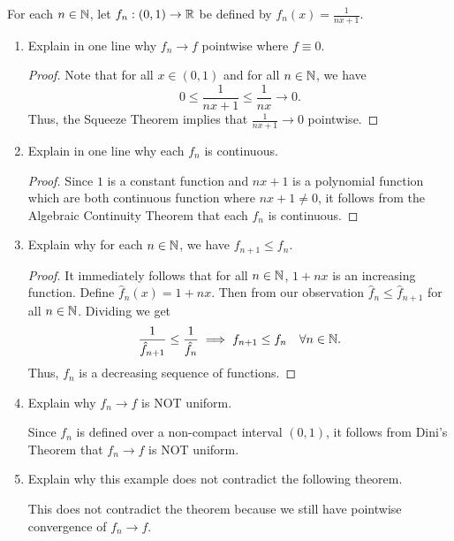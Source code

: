 \documentclass[a4paper]{article}
\begin{document}
\begin{problem}
    For each \( n \in \mathbb{N} \), let \( {f}_{n}: (0,1) \to \mathbb{R}  \) be defined by \( {f}_{n}(x) = \frac{ 1  }{  n x + 1  }  \).
\end{problem}
\begin{enumerate}
    \item Explain in one line why \( {f}_{n} \to f  \) pointwise where \( f \equiv 0  \).
        \begin{proof}
        Note that for all \( x \in (0,1)\) and for all \( n \in \mathbb{N} \), we have 
        \[  0 \leq \frac{ 1  }{  nx + 1  }  \leq \frac{ 1 }{ nx } \to 0. \]
        Thus, the Squeeze Theorem implies that \( \frac{ 1 }{ nx + 1  }  \to  0  \) pointwise.
        \end{proof}
    \item Explain in one line why each \( {f}_{n} \) is continuous. 
        \begin{proof}
        Since \( 1  \) is a constant function and \( nx + 1  \) is a polynomial function which are both continuous function where \( nx + 1 \neq 0  \), it follows from the Algebraic Continuity Theorem that each \( {f}_{n} \) is continuous.
        \end{proof}
    \item Explain why for each \( n \in \mathbb{N} \), we have \( {f}_{n+1}\leq {f}_{n} \).
        \begin{proof}
            It immediately follows that for all \( n \in \mathbb{N} \), \( 1 + nx  \) is an increasing function. Define \( \hat{f}_{n}(x) = 1 + nx \). Then from our observation \( \hat{f}_{n} \leq \hat{f}_{n+1} \) for all \( n \in \mathbb{N} \). Dividing we get 
            \[  \frac{ 1 }{ \hat{f}_{n+1} } \leq \frac{ 1 }{ \hat{f}_{n} } \implies {f}_{n+1} \leq {f}_{n}  \ \ \ \forall n \in \mathbb{N}.\]
            Thus, \( {f}_{n} \) is a decreasing sequence of functions.
        \end{proof}
    \item Explain why \( {f}_{n} \to f  \) is NOT uniform.
        \begin{solution}
        Since \( {f}_{n} \) is defined over a non-compact interval \( (0,1) \), it follows from Dini's Theorem that \( {f}_{n} \to f  \) is NOT uniform.
        \end{solution}
    \item Explain why this example does not contradict the following theorem.
        \begin{solution}
        This does not contradict the theorem because we still have pointwise convergence of \( {f}_{n} \to f  \).
        \end{solution}
\end{enumerate}
\end{document}
